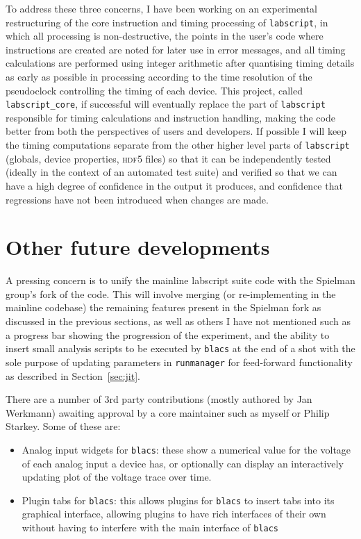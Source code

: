 To address these three concerns, I have been working on an experimental restructuring of the core instruction and timing processing of \texttt{labscript}, in which all processing is non-destructive, the points in the user's code where instructions are created are noted for later use in error messages, and all timing calculations are performed using integer arithmetic after quantising timing details as early as possible in processing according to the time resolution of the pseudoclock controlling the timing of each device. This project, called \texttt{labscript\_core}, if successful will eventually replace the part of \texttt{labscript} responsible for timing calculations and instruction handling, making the code better from both the perspectives of users and developers. If possible I will keep the timing computations separate from the other higher level parts of \texttt{labscript} (globals, device properties, \textsc{hdf5} files) so that it can be independently tested (ideally in the context of an automated test suite) and verified so that we can have a high degree of confidence in the output it produces, and confidence that regressions have not been introduced when changes are made.


\section{Other future developments}

A pressing concern is to unify the mainline labscript suite code with the Spielman group's fork of the code. This will involve merging (or re-implementing in the mainline codebase) the remaining features present in the Spielman fork as discussed in the previous sections, as well as others I have not mentioned such as a progress bar showing the progression of the experiment, and the ability to insert small analysis scripts to be executed by \texttt{blacs} at the end of a shot with the sole purpose of updating parameters in \texttt{runmanager} for feed-forward functionality as described in Section~\ref{sec:jit}.

There are a number of 3rd party contributions (mostly authored by Jan Werkmann) awaiting approval by a core maintainer such as myself or Philip Starkey. Some of these are:
\begin{itemize}
    \item Analog input widgets for \texttt{blacs}: these show a numerical value for the voltage of each analog input a device has, or optionally can display an interactively updating plot of the voltage trace over time.
    \item Plugin tabs for \texttt{blacs}: this allows plugins for \texttt{blacs} to insert tabs into its graphical interface, allowing plugins to have rich interfaces of their own without having to interfere with the main interface of \texttt{blacs}
\end{itemize}

